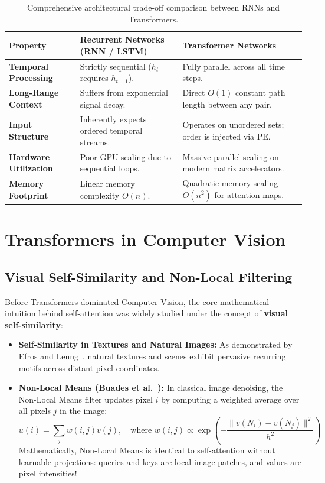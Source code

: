 \begin{table}[htbp]
\centering
\small
\renewcommand{\arraystretch}{1.2}
\begin{tabular}{p{} p{} p{}}
\toprule
\textbf{Property} & \textbf{Recurrent Networks (RNN / LSTM)} & \textbf{Transformer Networks} \\
\midrule
\textbf{Temporal Processing} & Strictly sequential ($h_t$ requires $h_{t-1}$). & Fully parallel across all time steps. \\
\textbf{Long-Range Context} & Suffers from exponential signal decay. & Direct $O(1)$ constant path length between any pair. \\
\textbf{Input Structure} & Inherently expects ordered temporal streams. & Operates on unordered sets; order is injected via PE\@. \\
\textbf{Hardware Utilization} & Poor GPU scaling due to sequential loops. & Massive parallel scaling on modern matrix accelerators. \\
\textbf{Memory Footprint} & Linear memory complexity $O(n)$. & Quadratic memory scaling $O(n^2)$ for attention maps. \\
\bottomrule
\end{tabular}
\caption{Comprehensive architectural trade-off comparison between RNNs and Transformers.}\label{tab:rnn_vs_transformer}
\end{table}


\section{Transformers in Computer Vision}

\subsection{Visual Self-Similarity and Non-Local Filtering}

Before Transformers dominated Computer Vision, the core mathematical intuition behind self-attention was widely studied under the concept of \textbf{visual self-similarity}:

\begin{itemize}[leftmargin=*]
    \item \textbf{Self-Similarity in Textures and Natural Images:} As demonstrated by Efros and Leung~\cite{efros1999texture}, natural textures and scenes exhibit pervasive recurring motifs across distant pixel coordinates.
    \item \textbf{Non-Local Means (Buades et al.~\cite{buades2005non}):} In classical image denoising, the Non-Local Means filter updates pixel $i$ by computing a weighted average over all pixels $j$ in the image:
    \begin{equation}
        u(i) = \sum_j w(i, j) v(j), \quad \text{where } w(i, j) \propto \exp\left(-\frac{\|v(N_i) - v(N_j)\|^2}{h^2}\right)
    \end{equation}
    Mathematically, Non-Local Means is identical to self-attention without learnable projections: queries and keys are local image patches, and values are pixel intensities!
\end{itemize}

